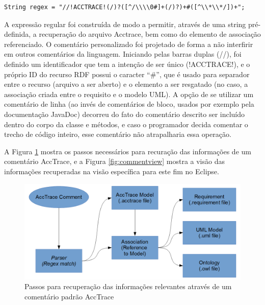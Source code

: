 \documentclass[runningheads,a4paper]{llncs}
\begin{document}
\medskip

\noindent
\begin{verbatim}
String regex = "//!ACCTRACE!(/)?([^/\\\\0#]+(/)?)+#([^\\*\\*/])+";
\end{verbatim}
%
\noindent

A expressão regular foi construída de modo a permitir, através de uma string pré-definida, a recuperação do arquivo Acctrace,
bem como do elemento de associação referenciado. O comentário personalizado foi projetado de forma a não interfirir em outros
comentários da linguagem. Iniciando pelas barras duplas (//), foi definido um
identificador que tem a intenção de ser único (!ACCTRACE!), e o próprio ID do recurso RDF possui o caracter ``\#'', que é usado para separador entre
o recurso (arquivo a ser aberto) e o elemento a ser resgatado (no caso, a
associação criada entre o requisito e o modelo UML). A opção de se
utilizar um comentário de linha (ao invés de comentários de bloco, usados por exemplo pela documentação JavaDoc) decorreu do fato
do comentário descrito ser incluído dentro do corpo da classe e métodos, e caso
o programador decida comentar o trecho de código inteiro, esse comentário não
atrapalharia essa operação.

A Figura \ref{fig:commentrecovery} mostra os passos necessários para recuração das informações de um comentário AccTrace, e a Figura \ref{fig:commentview}
mostra a visão das informações recuperadas na visão específica para este fim no Eclipse.

\begin{figure}[h!]
\centering
\includegraphics[scale=0.17]{./img/commentrecovery.png}
\caption{Passos para recuperação das informações relevantes através de um
comentário padrão AccTrace}
\label{fig:commentrecovery}
\end{figure} 
\end{document}
